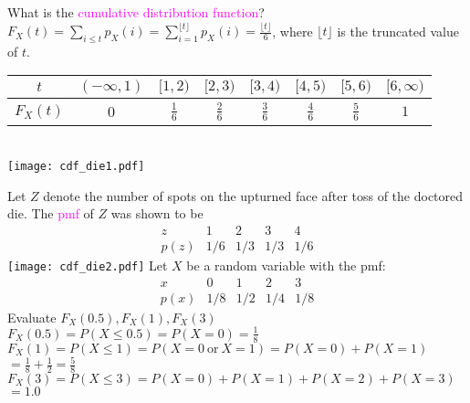 \documentclass[20pt,landscape]{foils}
\newcommand{\no}{\noindent}
\newcommand \h {\hspace*{.3in}}
\begin{document}
{{{{{{\no What is the {\textcolor{magenta}{cumulative distribution function}}?\\[.1in]
\no  {\textcolor{magenta}{Solution:} }   $F_X(t) = \sum_{i \le t}p_{X}(i) = \sum_{i =1}^{\lfloor{t}\rfloor}p_{X}(i) =
    \frac{\lfloor{t}\rfloor}{6}$, where $\lfloor{t}\rfloor$ is the truncated value of
    $t$.\\[.2in]
 \hspace*{1in}\begin{tabular}{c|ccccccc}
		$t$ & $(-\infty,1)$ & $ [1,2)$ & $[2,3)$ & $[3,4)$ & $[4,5)$ & $[5,6)$ & $[6,\infty)$\\
		\hline 
		$F_X(t)$ & 0  &$\frac{1}{6}$  & $\frac{2}{6}$ & $\frac{3}{6}$ & $\frac{4}{6}$ & $\frac{5}{6}$ & $ 1$ \\[.1in]
\end{tabular}   
\no {\textcolor{cyan}{See Example 3.1, 3.2 in Baron and Figure 3.1 for another example.}}
  \foilhead[-.76in]{\textcolor{blue}{Example of a cdf (continued...)}}  
\no  {\textcolor{magenta}{Plot of the cdf for the fair die tossing problem:} } \\[.01in]  
\hspace*{1.5in}\texttt{[image: cdf\_die1.pdf]}


\foilhead[-.78in]{\textcolor{blue}{Plots of pmf and cdf for the doctored die example}}  
\no Let $Z$ denote the number of spots on the upturned face after toss of the doctored die. The  
{\textcolor{magenta}{pmf}} of $Z$ was shown to be \\[-.3in]
    \[
	    \begin{array}{l||c|c|c|c}
		z & 1 & 2 & 3 & 4 \\ \hline
		p(z) & 1/6 & 1/3 & 1/3 & 1/6 
	    \end{array}
	    \]	    
\hspace*{2in}\texttt{[image: cdf\_die2.pdf]}
\foilhead[-.78in]{\textcolor{blue}{Example of computing CDFs}} 
\no Let $X$ be a random variable with the pmf:
  \[
	    \begin{array}{l||c|c|c|c}
		x & 0 & 1 & 2 & 3 \\ \hline
		p(x) & 1/8 & 1/2 & 1/4 & 1/8 
	    \end{array}
	    \]	    
\no  Evaluate $F_X(0.5),F_X(1), F_X(3)$\\[.25in]
\no  $F_X(0.5)=P(X\le0.5)=P(X=0)=\frac{1}{8}$\\[.2in]
\no  $F_X(1)=P(X\le 1)=P(X=0\ \text{or}\ X=1)=P(X=0)+P(X=1)$\\[.1in]
\no \h \h \h $=\frac{1}{8}+\frac{1}{2}=\frac{5}{8}$\\[.2in]
\no  $F_X(3)=P(X\le 3)=P(X=0)+P(X=1)+P(X=2)+P(X=3)$\\[.1in]
\no \h \h \h $=1.0$
 
}}}}}}
\end{document}
